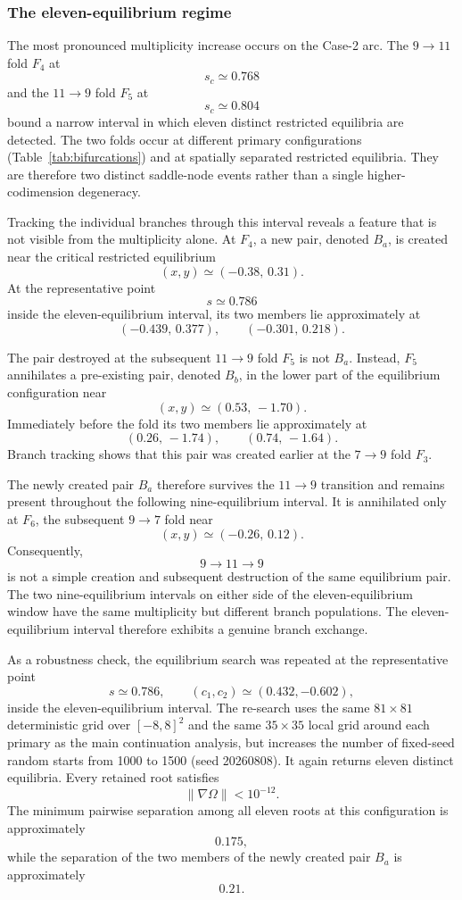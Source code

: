\subsubsection{The eleven-equilibrium regime}
\label{subsubsec:eleven}

The most pronounced multiplicity increase occurs on the Case-2 arc. The
$9\rightarrow11$ fold $F_4$ at
\[
s_c\simeq0.768
\]
and the $11\rightarrow9$ fold $F_5$ at
\[
s_c\simeq0.804
\]
bound a narrow interval in which eleven distinct restricted equilibria are
detected. The two folds occur at different primary configurations
(Table~\ref{tab:bifurcations}) and at spatially separated restricted
equilibria. They are therefore two distinct saddle-node events rather than
a single higher-codimension degeneracy.

Tracking the individual branches through this interval reveals a feature
that is not visible from the multiplicity alone. At $F_4$, a new pair,
denoted $B_a$, is created near the critical restricted equilibrium
\[
(x,y)\simeq(-0.38,\,0.31).
\]
At the representative point
\[
s\simeq0.786
\]
inside the eleven-equilibrium interval, its two members lie approximately
at
\[
(-0.439,\,0.377),
\qquad
(-0.301,\,0.218).
\]

The pair destroyed at the subsequent $11\rightarrow9$ fold $F_5$ is not
$B_a$. Instead, $F_5$ annihilates a pre-existing pair, denoted $B_b$, in
the lower part of the equilibrium configuration near
\[
(x,y)\simeq(0.53,\,-1.70).
\]
Immediately before the fold its two members lie approximately at
\[
(0.26,\,-1.74),
\qquad
(0.74,\,-1.64).
\]
Branch tracking shows that this pair was created earlier at the
$7\rightarrow9$ fold $F_3$.

The newly created pair $B_a$ therefore survives the
$11\rightarrow9$ transition and remains present throughout the following
nine-equilibrium interval. It is annihilated only at $F_6$, the subsequent
$9\rightarrow7$ fold near
\[
(x,y)\simeq(-0.26,\,0.12).
\]
Consequently,
\[
9\rightarrow11\rightarrow9
\]
is not a simple creation and subsequent destruction of the same equilibrium
pair. The two nine-equilibrium intervals on either side of the
eleven-equilibrium window have the same multiplicity but different branch
populations. The eleven-equilibrium interval therefore exhibits a genuine
branch exchange.

As a robustness check, the equilibrium search was repeated at the
representative point
\[
s\simeq0.786,
\qquad
(c_1,c_2)\simeq(0.432,-0.602),
\]
inside the eleven-equilibrium interval.
The re-search uses the same $81\times81$ deterministic grid over
$[-8,8]^2$ and the same $35\times35$ local grid around each primary as the
main continuation analysis, but increases the number of fixed-seed random
starts from 1000 to 1500 (seed 20260808). It again returns eleven distinct
equilibria. Every retained root satisfies
\[
\|\nabla\Omega\|<10^{-12}.
\]
The minimum pairwise separation among all eleven roots at this configuration
is approximately
\[
0.175,
\]
while the separation of the two members of the newly created pair $B_a$ is
approximately
\[
0.21.
\]

